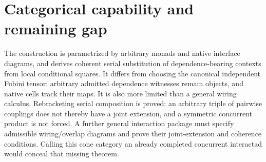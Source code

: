\documentclass[11pt]{article}
\begin{document}
\section{Categorical capability and remaining gap}
The construction is parametrized by arbitrary monads and native interface diagrams, and derives coherent serial substitution of dependence-bearing contexts from local conditional squares. It differs from choosing the canonical independent Fubini tensor: arbitrary admitted dependence witnesses remain objects, and native cells track their maps. It is also more limited than a general wiring calculus. Rebracketing serial composition is proved; an arbitrary triple of pairwise couplings does not thereby have a joint extension, and a symmetric concurrent product is not forced. A further general interaction package must specify admissible wiring/overlap diagrams and prove their joint-extension and coherence conditions. Calling this cone category an already completed concurrent interactad would conceal that missing theorem.
\end{document}
